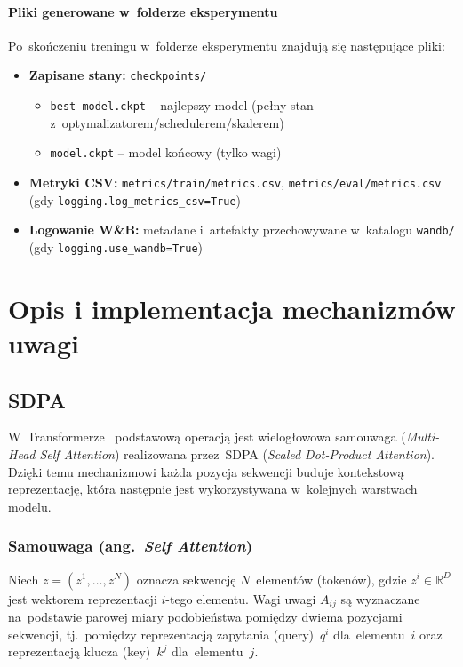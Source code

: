 \documentclass[a4paper,11pt,twoside]{report}
\theoremstyle{definition}
\begin{document}
\subsubsection{Pliki generowane w~folderze eksperymentu}
Po~skończeniu treningu w~folderze eksperymentu znajdują się następujące pliki:
\begin{itemize}
    \item \textbf{Zapisane stany:} \texttt{checkpoints/}
    \begin{itemize}
        \item \texttt{best-model.ckpt} -- najlepszy model (pełny stan z~optymalizatorem/schedulerem/skalerem)
        \item \texttt{model.ckpt} -- model końcowy (tylko wagi)
    \end{itemize}
    \item \textbf{Metryki CSV:} \texttt{metrics/train/metrics.csv}, \texttt{metrics/eval/metrics.csv} (gdy \texttt{logging.log\_metrics\_csv=True})
    \item \textbf{Logowanie W\&B:} metadane i~artefakty przechowywane w~katalogu \texttt{wandb/} (gdy \texttt{logging.use\_wandb=True})
\end{itemize}





\chapter{Opis i implementacja mechanizmów uwagi}


\section{SDPA}

W~Transformerze~\cite{vaswani2017attention} podstawową operacją jest wielogłowowa samouwaga (\emph{Multi-Head Self Attention}) realizowana przez~SDPA (\emph{Scaled Dot-Product Attention}). Dzięki temu mechanizmowi każda pozycja sekwencji buduje kontekstową reprezentację, która następnie jest wykorzystywana w~kolejnych warstwach modelu. 


\subsection{Samouwaga (ang.\ \emph{Self Attention})}

Niech $z = (z^1,\dots,z^N)$ oznacza sekwencję $N$~elementów (tokenów), gdzie $z^i \in \mathbb{R}^{D}$ jest wektorem reprezentacji $i$-tego elementu.
Wagi uwagi $A_{ij}$ są wyznaczane na~podstawie parowej miary podobieństwa pomiędzy dwiema pozycjami sekwencji, tj.\ pomiędzy reprezentacją zapytania (query)~$q^i$ dla~elementu~$i$ oraz reprezentacją klucza (key)~$k^j$ dla~elementu~$j$.
\end{document}
